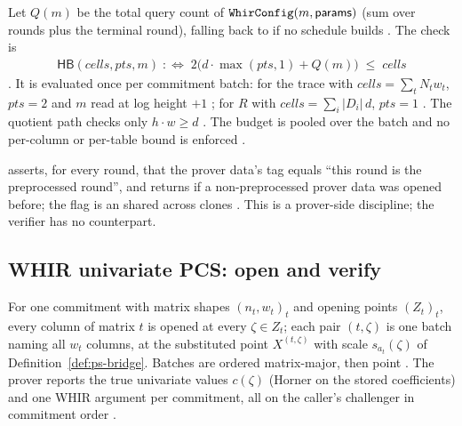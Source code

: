 \begin{definition}
\label{def:ps-budget}
Let $Q(m)$ be the total query count of $\texttt{WhirConfig}(m,\mathsf{params})$
(sum over rounds plus the terminal round), falling back to
 if no schedule builds . The check is
\begin{align}
  \mathsf{HB}(\mathit{cells}, \mathit{pts}, m) \;:\Longleftrightarrow\;
  2\big(d\cdot\max(\mathit{pts},1) + Q(m)\big) \;\le\; \mathit{cells}
\end{align}
. It is evaluated once per commitment batch: for the trace
with $\mathit{cells} = \sum_t N_t w_t$, $\mathit{pts}=2$ and $m$ read at log height
$+1$ ; for $R$ with $\mathit{cells} = \sum_i |D_i|\, d$,
$\mathit{pts}=1$ . The quotient path checks only
$h\cdot w \ge d$ . The budget is pooled over the batch and
no per-column or per-table bound is enforced .
\end{definition}

\begin{property}
\label{prop:ps-single-use}
 asserts, for every round, that the prover data's
 tag equals ``this round is the preprocessed round'', and
returns  if a non-preprocessed prover data was opened before;
the flag is an  shared across clones .
This is a prover-side discipline; the verifier has no counterpart.
\end{property}

\subsection{WHIR univariate PCS: open and verify}
\label{subsec:ps-open}

\begin{definition}
\label{def:ps-schedule}
For one commitment with matrix shapes $(n_t, w_t)_t$ and opening points
$(Z_t)_t$, every column of matrix $t$ is opened at every $\zeta \in Z_t$; each
pair $(t,\zeta)$ is one batch naming all $w_t$ columns, at the substituted point
$X^{(t,\zeta)}$ with scale $s_{a_t}(\zeta)$ of Definition~\ref{def:ps-bridge}.
Batches are ordered matrix-major, then point .
The prover reports the true univariate values $c(\zeta)$ (Horner on the stored
coefficients) and one WHIR argument per commitment, all on the caller's
challenger in commitment order .
\end{definition}

